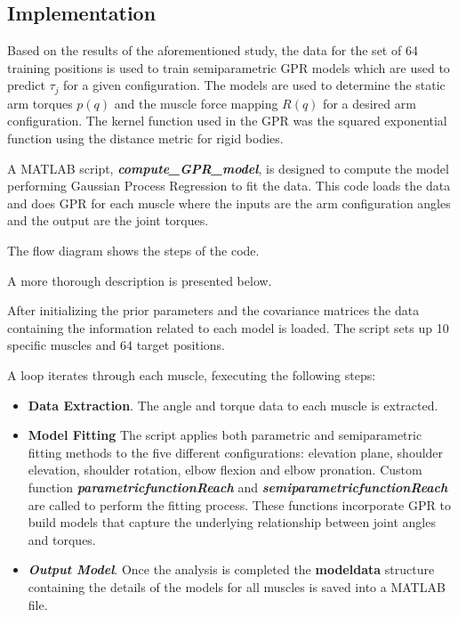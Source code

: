 \subsection{Implementation}

Based on the results of the aforementioned study, the data for the set of 64 training positions is used to train semiparametric GPR models which are used to predict $\tau_j$ for a given configuration. The models are used to determine the static arm torques $p(q)$ and the muscle force mapping $R(q)$ for a desired arm configuration.
The kernel function used in the GPR was the squared exponential function using the distance metric for rigid bodies. 
 
A MATLAB script, \textbf{\textit{compute\_GPR\_model}}, is designed to compute the model performing Gaussian Process Regression to fit the data. This code loads the data and does GPR for each muscle where the inputs are the arm configuration angles and the output are the joint torques.

The flow diagram shows the steps of the code.

A more thorough description is presented below.

After initializing the prior parameters and the covariance matrices the data containing the information related to each model is loaded. The script sets up 10 specific muscles and 64 target positions. 

A loop iterates through each muscle, fexecuting the following steps:

\begin{itemize}
    \item \textbf{Data Extraction}. The angle and torque data to each muscle is extracted.
    \item \textbf{Model Fitting} The script applies both parametric and semiparametric fitting methods to the five different configurations: elevation plane, shoulder elevation, shoulder rotation, elbow flexion and elbow pronation. Custom function \textbf{\textit{parametricfunctionReach}} and \textbf{\textit{semiparametricfunctionReach}} are called to perform the fitting process. These functions incorporate GPR to build models that capture the underlying relationship between joint angles and torques.
    \item \textbf{\textit{Output Model}}. Once the analysis is completed the \textbf{modeldata} structure containing the details of the models for all muscles is saved into a MATLAB file. 
\end{itemize}

